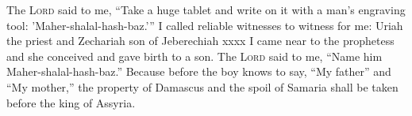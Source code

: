 
\begin{inparaenum}
   The \textsc{Lord} said to me, ``Take a huge tablet and write on it with a man's engraving tool: 'Maher-shalal-hash-baz.'\thinspace''%
   I called reliable witnesses to witness for me: Uriah the priest and Zechariah son of Jeberechiah xxxx%
   I came near to the prophetess and she conceived and gave birth to a son. The \textsc{Lord} said to me, ``Name him Maher-shalal-hash-baz.''%
   Because before the boy knows to say, ``My father'' and ``My mother,'' the property of Damascus and the spoil of Samaria shall be taken before the king of Assyria.%
  
  
  
  
  
  
\end{inparaenum}
